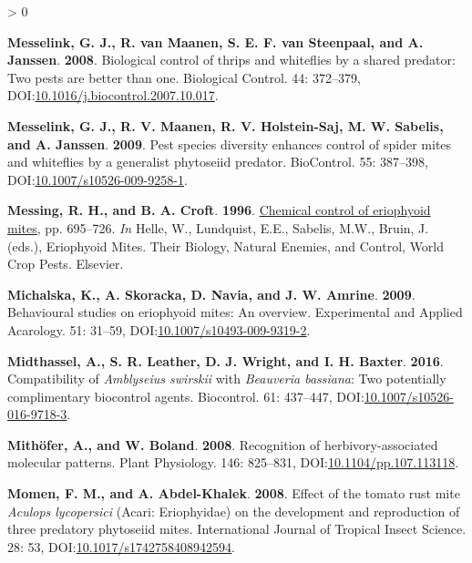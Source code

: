 \documentclass{ufdissertation}[overrideChapters] %
\newlength{\cslhangindent}
\newenvironment{CSLReferences}[2] %
 {%
  \setlength{\parindent}{0pt}
  \ifodd #1 \everypar{\setlength{\hangindent}{\cslhangindent}}\ignorespaces\fi
  \ifnum #2 > 0
  \setlength{\parskip}{#2\baselineskip}
  \fi
 }%
 {}
\begin{document}
{\begin{CSLReferences}{1}{1}
\leavevmode{}%
\textbf{Messelink, G. J., R. van Maanen, S. E. F. van Steenpaal, and A. Janssen}. \textbf{2008}. Biological control of thrips and whiteflies by a shared predator: Two pests are better than one. Biological Control. 44: 372--379, DOI:\href{https://doi.org/10.1016/j.biocontrol.2007.10.017}{10.1016/j.biocontrol.2007.10.017}.

\leavevmode{}%
\textbf{Messelink, G. J., R. V. Maanen, R. V. Holstein-Saj, M. W. Sabelis, and A. Janssen}. \textbf{2009}. Pest species diversity enhances control of spider mites and whiteflies by a generalist phytoseiid predator. {BioControl}. 55: 387--398, DOI:\href{https://doi.org/10.1007/s10526-009-9258-1}{10.1007/s10526-009-9258-1}.

\leavevmode{}%
\textbf{Messing, R. H., and B. A. Croft}. \textbf{1996}. \href{https://doi.org/10.1016/s1572-4379(96)80006-6}{Chemical control of eriophyoid mites}, pp. 695--726. \emph{In} Helle, W., Lundquist, E.E., Sabelis, M.W., Bruin, J. (eds.), Eriophyoid Mites. Their Biology, Natural Enemies, and Control, World Crop Pests. Elsevier.

\leavevmode{}%
\textbf{Michalska, K., A. Skoracka, D. Navia, and J. W. Amrine}. \textbf{2009}. Behavioural studies on eriophyoid mites: An overview. Experimental and Applied Acarology. 51: 31--59, DOI:\href{https://doi.org/10.1007/s10493-009-9319-2}{10.1007/s10493-009-9319-2}.

\leavevmode{}%
\textbf{Midthassel, A., S. R. Leather, D. J. Wright, and I. H. Baxter}. \textbf{2016}. Compatibility of {\emph{Amblyseius swirskii}} with {\emph{Beauveria bassiana}}: Two potentially complimentary biocontrol agents. Biocontrol. 61: 437--447, DOI:\href{https://doi.org/10.1007/s10526-016-9718-3}{10.1007/s10526-016-9718-3}.

\leavevmode{}%
\textbf{Mithöfer, A., and W. Boland}. \textbf{2008}. Recognition of herbivory-associated molecular patterns. Plant Physiology. 146: 825--831, DOI:\href{https://doi.org/10.1104/pp.107.113118}{10.1104/pp.107.113118}.

\leavevmode{}%
\textbf{Momen, F. M., and A. Abdel-Khalek}. \textbf{2008}. Effect of the tomato rust mite {\emph{Aculops lycopersici}} ({Acari}: {Eriophyidae}) on the development and reproduction of three predatory phytoseiid mites. International Journal of Tropical Insect Science. 28: 53, DOI:\href{https://doi.org/10.1017/s1742758408942594}{10.1017/s1742758408942594}.


\end{CSLReferences}}
\end{document}
